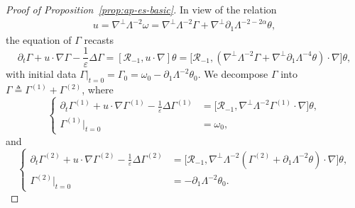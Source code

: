 \documentclass[reqno,11pt,a4paper]{amsart}
\begin{document}
\begin{proof}[Proof of Proposition~\ref{prop:ap-es-basic}]
In view of the relation 
\begin{align}\label{eq:u-Gam-rela}
  u=\nabla^\perp \Lambda^{-2}\omega = \nabla^\perp \Lambda^{-2} \Gamma + \nabla^\perp \partial_1 \Lambda^{-2-2\alpha} \theta,
\end{align}
the equation of $\Gamma$ recasts
\begin{equation}\label{eq:Gamma}
  \partial_t \Gamma +  u \cdot \nabla \Gamma  - \frac{1}{\varepsilon}\Delta \Gamma
   = \left[\mathcal{R}_{-1}, u\cdot \nabla\right] \theta  = \big[\mathcal{R}_{-1}, (\nabla^{\bot}\Lambda^{-2}\Gamma+\nabla^{\bot}\partial_1\Lambda^{-4}\theta)\cdot \nabla\big] \theta,
\end{equation}
with initial data $\Gamma|_{t=0}=\Gamma_0=\omega_0 - \partial_1\Lambda^{-2}\theta_0$.
We decompose $\Gamma$ into $\Gamma\triangleq \Gamma^{(1)}+\Gamma^{(2)}$, where
\begin{equation}\label{eq:Gamma1}
\left\{\begin{aligned}
  \partial_t \Gamma^{(1)} +  u \cdot \nabla \Gamma^{(1)}  - \frac{1}{\varepsilon}\Delta \Gamma^{(1)}
  &= \big[\mathcal{R}_{-1}, \nabla^{\bot}\Lambda^{-2}\Gamma^{(1)}\cdot \nabla\big] \theta,\\
  \Gamma^{(1)}|_{t=0}&=\omega_0 ,
\end{aligned}\right.
\end{equation}
and
\begin{equation}\label{eq:Gamma2}
  \left\{\begin{aligned}
   \partial_t \Gamma^{(2)} +  u \cdot \nabla \Gamma^{(2)}  - \frac{1}{\varepsilon}\Delta \Gamma^{(2)}
  &= \big[\mathcal{R}_{-1}, \nabla^{\bot}\Lambda^{-2}(\Gamma^{(2)}+\partial_1\Lambda^{-2}\theta)\cdot \nabla\big] \theta,\\
  \Gamma^{(2)}|_{t=0}&=-\partial_1\Lambda^{-2}\theta_0.
  \end{aligned}\right.
\end{equation}


\end{proof}
\end{document}
